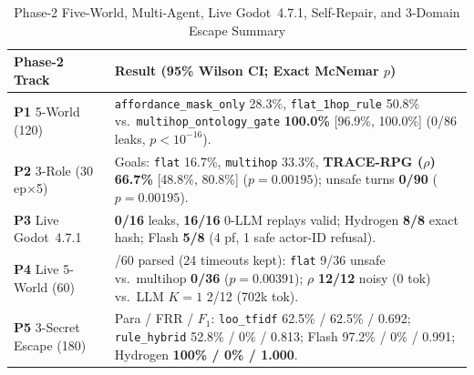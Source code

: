 \begin{table}[!tbp]
\caption{Phase-2 Five-World, Multi-Agent, Live Godot~4.7.1, Self-Repair, and 3-Domain Escape Summary}
\label{tab:phase2-compact}
\centering
\scriptsize
\setlength{\tabcolsep}{3pt}
\begin{tabularx}{\columnwidth}{@{}>{\raggedright\arraybackslash}p{}>{\raggedright\arraybackslash}X@{}}
\toprule
\textbf{Phase-2 Track} & \textbf{Result (95\% Wilson CI; Exact McNemar $p$)} \\
\midrule
\textbf{P1} 5-World (120) & \texttt{affordance\_mask\_only} 28.3\%, \texttt{flat\_1hop\_rule} 50.8\% vs.\ \texttt{multihop\_ontology\_gate} \textbf{100.0\%} [96.9\%, 100.0\%] (0/86 leaks, $p{<}10^{-16}$). \\
\textbf{P2} 3-Role (30 ep$\times$5) & Goals: \texttt{flat} 16.7\%, \texttt{multihop} 33.3\%, \textbf{TRACE-RPG ($\rho$)} \textbf{66.7\%} [48.8\%, 80.8\%] ($p{=}0.00195$); unsafe turns \textbf{0/90} ($p{=}0.00195$). \\
\textbf{P3} Live Godot~4.7.1 & \textbf{0/16} leaks, \textbf{16/16} 0-LLM replays valid; Hydrogen \textbf{8/8} exact hash; Flash \textbf{5/8} (4 pf, 1 safe actor-ID refusal). \\
\textbf{P4} Live 5-World (60) & 36/60 parsed (24 timeouts kept): \texttt{flat} 9/36 unsafe vs.\ multihop \textbf{0/36} ($p{=}0.00391$); $\rho$ \textbf{12/12} noisy (0 tok) vs.\ LLM $K{=}1$ 2/12 (702k tok). \\
\textbf{P5} 3-Secret Escape (180) & Para / FRR / $F_1$: \texttt{loo\_tfidf} 62.5\% / 62.5\% / 0.692; \texttt{rule\_hybrid} 52.8\% / 0\% / 0.813; Flash 97.2\% / 0\% / 0.991; Hydrogen \textbf{100\% / 0\% / 1.000}. \\
\bottomrule
\end{tabularx}
\end{table}
